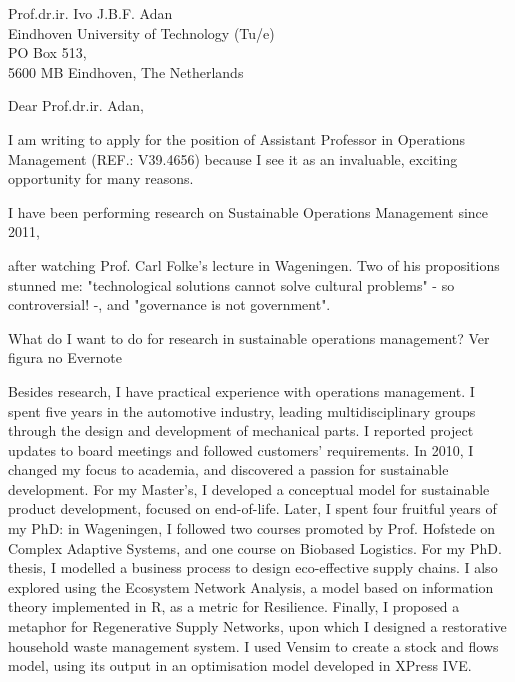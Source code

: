 \documentclass[sender,
    paper=a4,
    version=last,
    fontsize=12pt,
    DIV=12,
    BCOR=0mm]{scrlttr2}
\begin{document}

\begin{letter}{
    Prof.dr.ir. Ivo J.B.F. Adan \\
    Eindhoven University of Technology (Tu/e)\\
    PO Box 513, \\
    5600 MB Eindhoven, The Netherlands
} 

\opening{Dear Prof.dr.ir. Adan,}


\parindent8mm

I am writing to apply for the position of Assistant Professor in Operations Management (REF.: V39.4656) because I see it as an invaluable, exciting opportunity for many reasons. 

I have been performing research on Sustainable Operations Management since 2011, 

after watching Prof. Carl Folke's lecture in Wageningen. Two of his propositions stunned me: "technological solutions cannot solve cultural problems" - so controversial! -, and "governance is not government". 

What do I want to do for research in sustainable operations management? Ver figura no Evernote

Besides research, I have practical experience with operations management. I spent five years in the automotive industry, leading multidisciplinary groups through the design and development of mechanical parts. I reported project updates to board meetings and followed customers' requirements. In 2010, I changed my focus to academia, and discovered a passion for sustainable development. For my Master's, I developed a conceptual model for sustainable product development, focused on end-of-life. Later, I spent four fruitful years of my PhD: in Wageningen, I followed two courses promoted by Prof. Hofstede on Complex Adaptive Systems, and one course on Biobased Logistics. For my PhD. thesis, I modelled a business process to design eco-effective supply chains. I also explored using the Ecosystem Network Analysis, a model based on information theory implemented in R, as a metric for Resilience. Finally, I proposed a metaphor for Regenerative Supply Networks, upon which I designed a restorative household waste management system. I used Vensim to create a stock and flows model, using its output in an optimisation model developed in XPress IVE. 


\end{letter}
\end{document}

